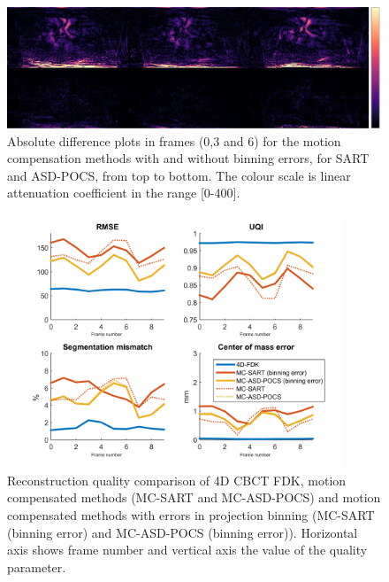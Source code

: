 \begin{figure}
\begin{center}

\includegraphics[width=\textwidth]{accuracyMC/diffbinninMCCBCT3stage.png} 


\end{center}

\caption[Three difference frames of the  motion compensation methods with projection binning errors]{\label{fig:binMCCBCT3static} Absolute difference plots in frames (0,3 and 6) for the motion compensation methods with and without binning errors, for SART and ASD-POCS, from top to bottom.  The colour scale is linear attenuation coefficient in the range [0-400].} 
\end{figure}


\begin{figure}
\begin{center}

\includegraphics[width=0.9\textwidth]{accuracyMC/binningMCCBCTparams.png} 


\end{center}

\caption[Reconstruction quality comparison of motion compensation]{\label{fig:binMCCBCTquality}  Reconstruction quality comparison of 4D CBCT FDK, motion compensated methods (MC-SART and MC-ASD-POCS) and motion compensated methods with errors in projection binning (MC-SART (binning error) and MC-ASD-POCS (binning error)). Horizontal axis shows frame number and vertical axis the value of the quality parameter.} 
\end{figure}



